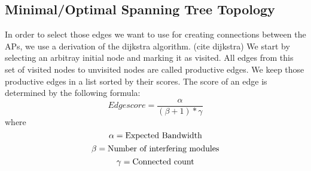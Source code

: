   \subsection{Minimal/Optimal Spanning Tree Topology}
  In order to select those edges we want to use for creating connections between the APs, we use a derivation of the dijkstra algorithm. (cite dijkstra)
  We start by selecting an arbitray initial node and marking it as visited. All edges from this set of visited nodes to unvisited nodes are called productive edges.
  We keep those productive edges in a list sorted by their scores. The score of an edge is determined by the following formula:
  $$Edgescore=\frac{\alpha}{(\beta + 1 )* \gamma}$$
  where $$\alpha = \textnormal{Expected Bandwidth}\newline$$
  $$\beta = \textnormal{Number of interfering modules}\newline$$
  $$\gamma = \textnormal{Connected count}\newline$$
